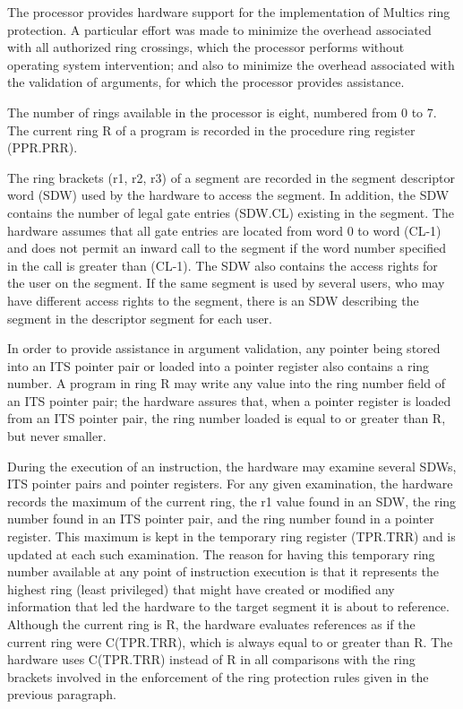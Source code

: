The processor provides hardware support for the implementation of Multics ring
protection.  A particular effort was made to minimize the overhead associated
with all authorized ring crossings, which the processor performs without
operating system intervention; and also to minimize the overhead associated
with the validation of arguments, for which the processor provides assistance.

The number of rings available in the processor is eight, numbered from 0 to 7.
The current ring R of a program is recorded in the procedure ring register
(PPR.PRR).  

The ring brackets (r1, r2, r3) of a segment are recorded in the segment
descriptor word (SDW) used by the hardware to access the segment. In addition,
the SDW contains the number of legal gate entries (SDW.CL) existing in the
segment. The hardware assumes that all gate entries are located from word 0 to
word (CL-1) and does not permit an inward call to the segment if the word
number specified in the call is greater than (CL-1). The SDW also contains the
access rights for the user on the segment. If the same segment is used by
several users, who may have different access rights to the segment, there is an
SDW describing the segment in the descriptor segment for each user.


In order to provide assistance in argument validation, any pointer being stored
into an ITS pointer pair or loaded into a pointer register also contains a ring
number. A program in ring R may write any value into the ring number field of
an ITS pointer pair; the hardware assures that, when a pointer register is
loaded from an ITS pointer pair, the ring number loaded is equal to or greater
than R, but never smaller.


During the execution of an instruction, the hardware may examine several SDWs,
ITS pointer pairs and pointer registers. For any given examination, the
hardware records the maximum of the current ring, the r1 value found in an SDW,
the ring number found in an ITS pointer pair, and the ring number found in a
pointer register. This maximum is kept in the temporary ring register (TPR.TRR)
and is updated at each such examination. The reason for having this temporary
ring number available at any point of instruction execution is that it
represents the highest ring (least privileged) that might have created or
modified any information that led the hardware to the target segment it is
about to reference. Although the current ring is R, the hardware evaluates
references as if the current ring were C(TPR.TRR), which is always equal to or
greater than R. The hardware uses C(TPR.TRR) instead of R in all comparisons
with the ring brackets involved in the enforcement of the ring protection rules
given in the previous paragraph.


